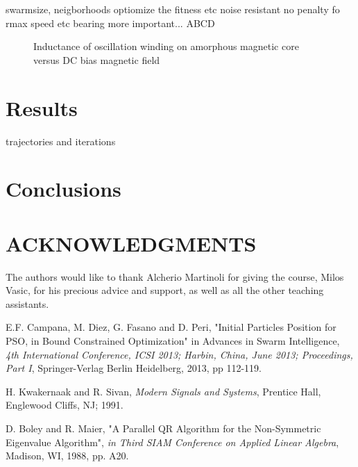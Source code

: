 \documentclass[a4, 10 pt, conference]{ieeeconf}  %
\begin{document}
swarmsize, neigborhoods
optiomize the fitness etc noise resistant
no penalty fo rmax speed etc
bearing more important... ABCD


   \begin{figure}[thpb]
      \centering
      \caption{Inductance of oscillation winding on amorphous
       magnetic core versus DC bias magnetic field}
      \label{figurelabel}
   \end{figure}

\section{Results}
trajectories and iterations
\section{Conclusions}

\section{ACKNOWLEDGMENTS}
The authors would like to thank Alcherio Martinoli for giving the course, Milos Vasic, for his precious advice and support, as well as all the other teaching assistants.

\begin{thebibliography}{99}

E.F. Campana, M. Diez, G. Fasano and D. Peri, "Initial Particles Position for PSO,
in Bound Constrained Optimization" in Advances in Swarm Intelligence, {\it 4th International Conference, ICSI 2013; Harbin, China, June 2013; Proceedings, Part I}, Springer-Verlag Berlin Heidelberg, 2013, pp 112-119.

H. Kwakernaak and R. Sivan, {\it Modern Signals and Systems}, Prentice Hall, Englewood Cliffs, NJ; 1991.

D. Boley and R. Maier, "A Parallel QR Algorithm for the Non-Symmetric Eigenvalue Algorithm", {\it in Third SIAM Conference on Applied Linear Algebra}, Madison, WI, 1988, pp. A20.

\end{thebibliography}
\end{document}
